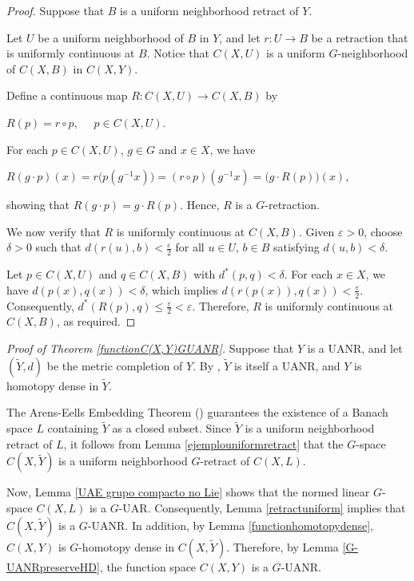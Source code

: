 \documentclass[12pt]{amsart}
\theoremstyle{definition}
\begin{document}
	\begin{proof}
		
	Suppose that $B$ is a uniform neighborhood retract of $Y$.
	
	Let $U$ be a uniform neighborhood of $B$ in $Y$, and let $r: U\rightarrow B$ be a retraction that is uniformly continuous at $B$. Notice that $C(X,U)$ is a uniform $G$-neighborhood of $C(X,B)$ in $C(X,Y)$.
	
	Define a continuous map $R:C(X,U)\rightarrow C(X,B)$ by
	
	\begin{center}
		$R(p)=r\circ p,\quad$ $p\in C(X,U)$.
	\end{center}
	
	For each $p\in C(X,U)$, $g\in G$ and $x\in X$, we have
	\begin{center}
		$R(g\cdot p)(x)=r\big(p(g^{-1} x)\big)=(r\circ p)(g^{-1} x)=\big(g\cdot R(p)\big)(x)$,
	\end{center}
	showing that $R(g\cdot p)=g\cdot R(p)$. Hence, $R$ is a $G$-retraction.
	
	We now verify that $R$ is uniformly continuous at $C(X,B)$. Given $\varepsilon > 0$, choose $\delta > 0$ such that $d(r(u),b)<\frac{\varepsilon}{2}$ for all $u\in U$, $b\in B$ satisfying $d(u,b)<\delta$.
	
	Let $p\in C(X,U)$ and $q\in C(X,B)$ with $d^*(p,q)<\delta$. For each $x\in X$, we have $d(p(x),q(x))<\delta$, which implies $d(r(p(x)),q(x))<\frac{\varepsilon}{2}$. Consequently, $d^*(R(p),q)\leq \frac{\varepsilon}{2}<\varepsilon$. Therefore, $R$ is uniformly continuous at $C(X,B)$, as required.
		
	\end{proof}
	
	\noindent\textit{Proof of Theorem \ref{functionC(X,Y)GUANR}.}
		Suppose that $Y$ is a UANR, and let $(\widetilde{Y},d)$ be the metric completion of $Y$. By \cite[Theorem 2]{KS1}, $\widetilde{Y}$ is itself a UANR, and $Y$ is homotopy dense in $\widetilde{Y}$.
		
		The Arens-Eells Embedding Theorem (\cite[Theorem 6.2.1]{KS2}) guarantees the existence of a Banach space $L$ containing $\widetilde{Y}$ as a closed subset. Since $\widetilde{Y}$ is a uniform neighborhood retract of $L$, it follows from Lemma \ref{ejemplouniformretract} that the $G$-space $C(X,\widetilde{Y})$ is a  uniform neighborhood $G$-retract of $C(X,L)$.  
		
		
		Now, Lemma \ref{UAE grupo compacto no Lie} shows that the normed linear $G$-space $C(X,L)$ is a $G$-UAR. Consequently, Lemma \ref{retractuniform} implies that $C(X,\widetilde{Y})$ is a $G$-UANR. In addition, by Lemma \ref{functionhomotopydense}, $C(X,Y)$ is $G$-homotopy dense in $C(X,\widetilde{Y})$. Therefore, by Lemma \ref{G-UANRpreserveHD}, the function space $C(X,Y)$ is a $G$-UANR.
		
\end{document}
